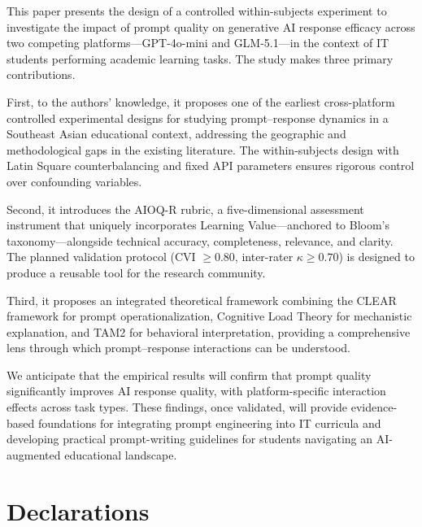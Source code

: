 \documentclass[runningheads]{llncs}
\begin{document}
This paper presents the design of a controlled within-subjects experiment to investigate the impact of prompt quality on generative AI response efficacy across two competing platforms---GPT-4o-mini and GLM-5.1---in the context of IT students performing academic learning tasks. The study makes three primary contributions.

First, to the authors' knowledge, it proposes one of the earliest cross-platform controlled experimental designs for studying prompt--response dynamics in a Southeast Asian educational context, addressing the geographic and methodological gaps in the existing literature. The within-subjects design with Latin Square counterbalancing and fixed API parameters ensures rigorous control over confounding variables.

Second, it introduces the AIOQ-R rubric, a five-dimensional assessment instrument that uniquely incorporates Learning Value---anchored to Bloom's taxonomy---alongside technical accuracy, completeness, relevance, and clarity. The planned validation protocol (CVI $\geq 0.80$, inter-rater $\kappa \geq 0.70$) is designed to produce a reusable tool for the research community.

Third, it proposes an integrated theoretical framework combining the CLEAR framework for prompt operationalization, Cognitive Load Theory for mechanistic explanation, and TAM2 for behavioral interpretation, providing a comprehensive lens through which prompt--response interactions can be understood.

We anticipate that the empirical results will confirm that prompt quality significantly improves AI response quality, with platform-specific interaction effects across task types. These findings, once validated, will provide evidence-based foundations for integrating prompt engineering into IT curricula and developing practical prompt-writing guidelines for students navigating an AI-augmented educational landscape.

\section*{Declarations}\label{sec:declarations}
\end{document}
